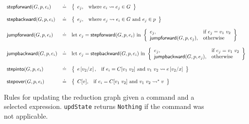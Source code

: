 \begin{figure*}[t]
\[
\begin{array}{lcl}
\stepforward{G}{p}{e_i}  &\defeq& \left\{\begin{array}{ll}
    e_j, & \text{where } \singlestep{e_i}{e_j} \in G
                         \end{array}\right\} \\ \\
\stepbackward{G}{p}{e_i}  &\defeq& \left\{\begin{array}{ll}
    e_j, & \text{where } \singlestep{e_j}{e_i} \in G \text{ and } e_j \in p
                         \end{array}\right\} \\ \\
\jumpforward{G}{p}{e_i} &\defeq& \text{let } e_j = \stepforward{G}{p}{e_i} \text{ in }
                         \left\{\begin{array}{ll}
                         e_j, & \text{if } e_j = \eapp{v_1}{v_2} \\
                         \jumpforward{G}{p}{e_{j}}, & \text{otherwise}
                         \end{array}\right\} \\ \\
\jumpbackward{G}{p}{e_i} &\defeq& \text{let } e_j = \stepbackward{G}{p}{e_i} \text{ in }
                         \left\{\begin{array}{ll}
                         e_j, & \text{if } e_j = \eapp{v_1}{v_2} \\
                         \jumpbackward{G}{p}{e_{j}}, & \text{otherwise}
                         \end{array}\right\} \\ \\
\stepinto{G}{p}{e_i} &\defeq& \left\{\begin{array}{ll}
                         e\sub{x}{v_2}, & \text{if } e_i = C[\eapp{v_1}{v_2}] \text{ and } \singlestep{\eapp{v_1}{v_2}}{e\sub{x}{v_2}}
                         \end{array}\right\} \\ \\
\stepover{G}{p}{e_i} &\defeq& \left\{\begin{array}{ll}
                         C[v], & \text{if } e_i = C[\eapp{v_1}{v_2}] \text{ and } \multistep{\eapp{v_1}{v_2}}{v}
                         \end{array}\right\}
\end{array}
\]
\caption{Rules for updating the reduction graph given a command and a selected expression. \texttt{updState} returns \texttt{Nothing} if the command was not applicable. %
}
\label{fig:traversing-graph}
\end{figure*}

